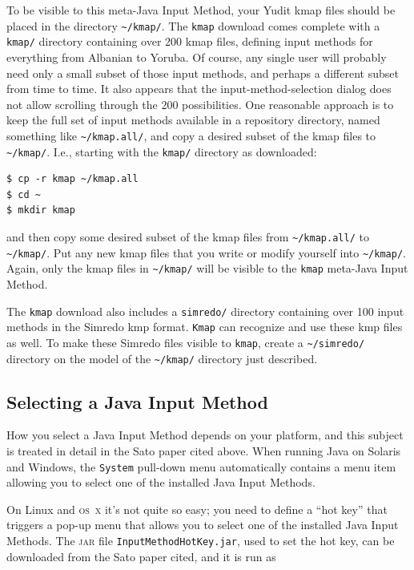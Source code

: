 \documentclass[letterpaper,12pt]{article}
\newcommand{\acro}{\textsc}
\begin{document}
To be visible to this meta-Java Input Method, your Yudit kmap files
should be placed in the directory \texttt{\~{}/kmap/}.  The
\texttt{kmap} download
comes complete with a \texttt{kmap/} directory containing over 200 kmap
files, defining input methods for everything from Albanian to Yoruba.  Of
course, any single user will probably need only a small subset of those
input methods, and perhaps a different subset from time to time.  It also
appears that the input-method-selection dialog does not allow scrolling
through the 200 possibilities.  One reasonable approach is to keep the
full set of input methods available in a repository directory, named
something like \texttt{\~{}/kmap.all/}, and copy a desired subset of the
kmap files  to \texttt{\~{}/kmap/}.  I.e., starting with the
\texttt{kmap/} directory as downloaded:

\begin{Verbatim}[fontsize=\small]
$ cp -r kmap ~/kmap.all
$ cd ~
$ mkdir kmap
\end{Verbatim}

\noindent
and then copy some desired subset of the kmap files from
\texttt{\~{}/kmap.all/} to \texttt{\~{}/kmap/}.  Put any new kmap
files that you write or modify yourself into \texttt{\~{}/kmap/}.  
Again, only the kmap
files in \texttt{\~{}/kmap/} will be visible to the \texttt{kmap} meta-Java Input
Method.

The \texttt{kmap} download also includes a \texttt{simredo/} directory containing
over 100 input methods in the Simredo kmp format.  \texttt{Kmap} can recognize and
use these kmp files as well.  To make these Simredo files visible to
\texttt{kmap}, create a \texttt{\~{}/simredo/} directory on the model of the
\texttt{\~{}/kmap/} directory just described.

\subsection{Selecting a Java Input Method}

How you select a Java Input Method depends on your platform, and this
subject is treated in detail in the Sato paper cited above.  When running
Java on Solaris and Windows, the \texttt{System} pull-down menu
automatically contains a menu item allowing you to select one of the
installed Java Input Methods.

On Linux and \acro{os~x} it's not quite so easy; 
you need to define a ``hot key'' that triggers a
pop-up menu that allows you to select one of the installed Java Input
Methods.  The \acro{jar} file \texttt{InputMethodHotKey.jar}, used
to set the hot key, can be
downloaded from the Sato paper cited, and it is run as
\end{document}
